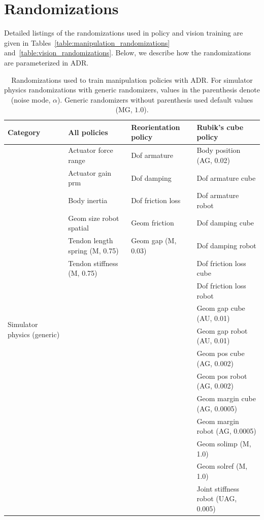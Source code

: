 \section{Randomizations}
\label{app:randomizations}

Detailed listings of the randomizations used in policy and vision training are given in Tables~\ref{table:manipulation_randomizations} and~\ref{table:vision_randomizations}. Below, we describe how the randomizations are parameterized in ADR.

\begin{table}[h]
    \caption{Randomizations used to train manipulation policies with ADR. For simulator physics randomizations with generic randomizers, values in the parenthesis denote (noise mode, $\alpha$). Generic randomizers without parenthesis used default values (MG, $1.0$).}
    \centering
    \renewcommand{\arraystretch}{1.3}
    \begin{tabular}{@{}l|l|l|l@{}}
        \toprule
        \textbf{Category} & \textbf{All policies} & \textbf{Reorientation policy} & \textbf{Rubik's cube policy} \\
        \midrule
	\multirow{16}{2cm}{Simulator physics (generic)} 	
       			& Actuator force range & Dof armature & Body position (AG, 0.02) \\
       			& Actuator gain prm & Dof damping & Dof armature cube \\
			& Body inertia & Dof friction loss & Dof armature robot \\
			& Geom size robot spatial & Geom friction	 & Dof damping cube	 \\
			& Tendon length spring (M, 0.75) & Geom gap (M, 0.03) & Dof damping robot \\
			& Tendon stiffness (M, 0.75) & & Dof friction loss cube \\
			& & & Dof friction loss robot \\
			& & & Geom gap cube (AU, 0.01) \\
			& & & Geom gap robot (AU, 0.01) \\
			& & & Geom pos cube (AG, 0.002) \\
			& & & Geom pos robot (AG, 0.002) \\
			& & & Geom margin cube (AG, 0.0005) \\
			& & & Geom margin robot (AG, 0.0005) \\
			& & & Geom solimp (M, 1.0) \\
			& & & Geom solref (M, 1.0) \\
			& &  & Joint stiffness robot (UAG, 0.005) \\

\end{tabular}
\end{table}
